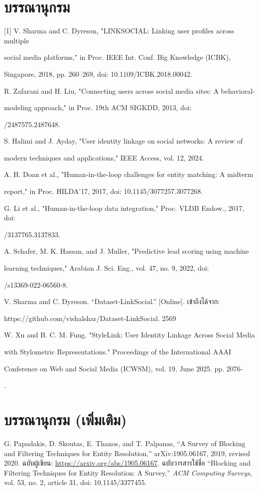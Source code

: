 \documentclass[12pt,a4paper]{report}
\begin{document}
\section*{บรรณานุกรม}
[1] V. Sharma and C. Dyreson, "LINKSOCIAL: Linking user profiles across multiple\par
social media platforms," in Proc. IEEE Int. Conf. Big Knowledge (ICBK),\par
Singapore, 2018, pp. 260–269, doi: 10.1109/ICBK.2018.00042.\par
[2] R. Zafarani and H. Liu, "Connecting users across social media sites: A behavioral-\par
modeling approach," in Proc. 19th ACM SIGKDD, 2013, doi:\par
{}/2487575.2487648.\par
[3] S. Halimi and J. Ayday, "User identity linkage on social networks: A review of\par
modern techniques and applications," IEEE Access, vol. 12, 2024.\par
[4] A. H. Doan et al., "Human-in-the-loop challenges for entity matching: A midterm\par
report," in Proc. HILDA'17, 2017, doi: 10.1145/3077257.3077268.\par
[5] G. Li et al., "Human-in-the-loop data integration," Proc. VLDB Endow., 2017, doi:\par
{}/3137765.3137833.\par
[6] A. Schafer, M. K. Hassan, and J. Muller, "Predictive lead scoring using machine\par
learning techniques," Arabian J. Sci. Eng., vol. 47, no. 9, 2022, doi:\par
{}/s13369-022-06560-8.\par
[7] V. Sharma and C. Dyreson. “Dataset-LinkSocial.” [Online]. เข้าถึงได้จาก:\par
https://github.com/vishalshar/Dataset-LinkSocial. 2569\par
[8] W. Xu and B. C. M. Fung. "StyleLink: User Identity Linkage Across Social Media\par
with Stylometric Representations." Proceedings of the International AAAI\par
Conference on Web and Social Media (ICWSM), vol. 19, June 2025. pp. 2076-\par
{}.\par
\clearpage
\section*{บรรณานุกรม (เพิ่มเติม)}
\noindent [9] G. Papadakis, D. Skoutas, E. Thanos, and T. Palpanas, ``A Survey of Blocking and Filtering Techniques for Entity Resolution,'' arXiv:1905.06167, 2019, revised 2020. ฉบับผู้เขียน: \url{https://arxiv.org/abs/1905.06167}. ฉบับวารสารใช้ชื่อ ``Blocking and Filtering Techniques for Entity Resolution: A Survey,'' \textit{ACM Computing Surveys}, vol. 53, no. 2, article 31, doi: 10.1145/3377455.
\end{document}
